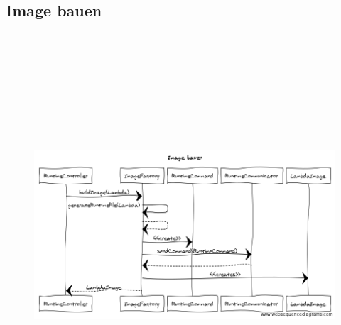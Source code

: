 \documentclass[a4paper,20pt,oneside]{book}
\begin{document}
	\subsection{Image bauen}
	\begin{figure}[!hb]
    \includegraphics[width=18cm,height=15cm]{buildImage}
\end{figure}
\newpage
\end{document}
